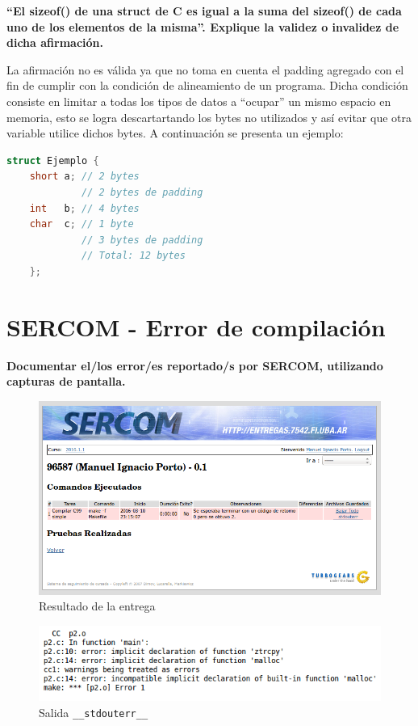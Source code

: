 \documentclass{article}
\begin{document}
\textbf{``El sizeof() de una struct de C es igual a la suma del sizeof() de cada uno de los elementos de la misma''. Explique la validez o invalidez de dicha afirmación.}\newline

    La afirmación no es válida ya que no toma en cuenta el padding agregado con el fin de cumplir con la condición de alineamiento de un programa. Dicha condición consiste en limitar a todas los tipos de datos a ``ocupar'' un mismo espacio en memoria, esto se logra descartartando los bytes no utilizados y así evitar que otra variable utilice dichos bytes. A continuación se presenta un ejemplo:
    
    \begin{lstlisting}[language=C]
    struct Ejemplo {
    short a; // 2 bytes
             // 2 bytes de padding
    int   b; // 4 bytes
    char  c; // 1 byte
             // 3 bytes de padding
             // Total: 12 bytes
    };
    \end{lstlisting}
    
\section{SERCOM - Error de compilación}
    
\textbf{Documentar el/los error/es reportado/s por SERCOM, utilizando capturas de pantalla.}
    \begin{figure}[H]
        \includegraphics[width=\columnwidth]{p2}
        \caption{Resultado de la entrega}
    \end{figure}
    
    \begin{figure}[H]
        \includegraphics[width=\columnwidth]{p2_stderr}
        \caption{Salida \texttt{\_\_stdouterr\_\_}}
    \end{figure}
    
\end{document}
